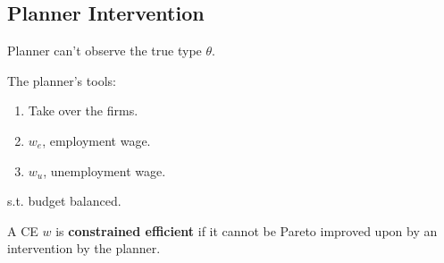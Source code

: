 \documentclass[11pt]{elegantbook_2}
\begin{document}
\subsection{Planner Intervention}
Planner can't observe the true type $\theta$.

The planner's tools:
\begin{enumerate}
    \item Take over the firms.
    \item $w_e$, employment wage.
    \item $w_u$, unemployment wage.
\end{enumerate}
s.t. budget balanced.

\begin{definition}
    A CE $w$ is \textbf{constrained efficient} if it cannot be Pareto improved upon by an intervention by the planner.
\end{definition}
\end{document}

